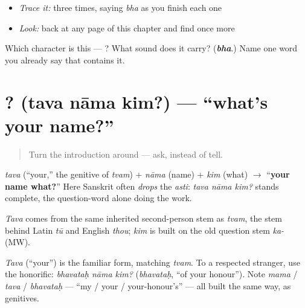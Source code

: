 \begin{quote}
\end{quote}

\begin{itemize}
\raggedright
  \item \emph{Trace it:}  three times, saying \emph{bha} as you finish each one
  \item \emph{Look:} back at any page of this chapter and find  once more
\end{itemize}

\begin{tcolorbox}[breakable,colback=teal!4,colframe=teal!35!black,title={Before you move on}]
Which character is this — ? What sound does it carry? (\emph{\textbf{bha}}.) Name one word you already say that contains it.
\end{tcolorbox}
\section[\texorpdfstring{\sk{तव} \sk{नाम} \sk{किम्}? (tava nāma kim?)}{तव नाम किम्? (tava nāma kim?)}]{  ? (tava nāma kim?) — \textquotedblleft{}what's your name?\textquotedblright{}}

\label{lesson:SA-C02-tava-nama-kim}



\begin{quote}
Turn the introduction around — ask, instead of tell.
\end{quote}

\begin{cousinweb}
\emph{tava} (\textquotedblleft{}your,\textquotedblright{} the genitive of \emph{tvam}) + \emph{nāma} (name) + \emph{kim} (what) $\to$ \textquotedblleft{}\textbf{your name what?}\textquotedblright{} Here Sanskrit often \emph{drops} the \emph{asti}: \emph{tava nāma kim?} stands complete, the question-word alone doing the work.

\emph{Tava} comes from the same inherited second-person stem as \emph{tvam}, the stem behind Latin \emph{tū} and English \emph{thou}; \emph{kim} is built on the old question stem \emph{ka-} (MW).
\end{cousinweb}

\begin{grammarlens}[title={Grammar Lens: the respectful version}]
\emph{Tava} (\textquotedblleft{}your\textquotedblright{}) is the familiar form, matching \emph{tvam}. To a respected stranger, use the honorific: \emph{bhavataḥ nāma kim?} (\emph{bhavataḥ}, \textquotedblleft{}of your honour\textquotedblright{}). Note \emph{mama} / \emph{tava} / \emph{bhavataḥ} — \textquotedblleft{}my / your / your-honour's\textquotedblright{} — all built the same way, as genitives.
\end{grammarlens}

